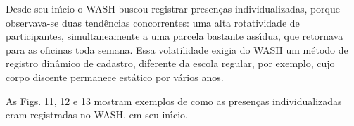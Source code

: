 \documentclass[
12pt,		%
openright,	%
twoside,  %
a4paper,			%
chapter=TITLE,		%
english,			%
french,				%
spanish,			%
brazil				%
]{USPSC-classe/USPSC}
\begin{document}
Desde seu in\'{\i}cio o WASH buscou registrar presen\c{c}as individualizadas, porque observava-se duas tend\^encias concorrentes: uma alta rotatividade de participantes, simultaneamente a uma parcela bastante ass\'{\i}dua, que retornava para as oficinas toda semana. Essa volatilidade exigia do WASH um m\'etodo de registro din\^amico de cadastro, diferente da escola regular, por exemplo, cujo corpo discente  permanece est\'atico por v\'arios anos.








As Figs. 11, 12 e 13 mostram exemplos de como as presen\c{c}as individualizadas eram registradas no WASH, em seu in\'{\i}cio.
\end{document}
